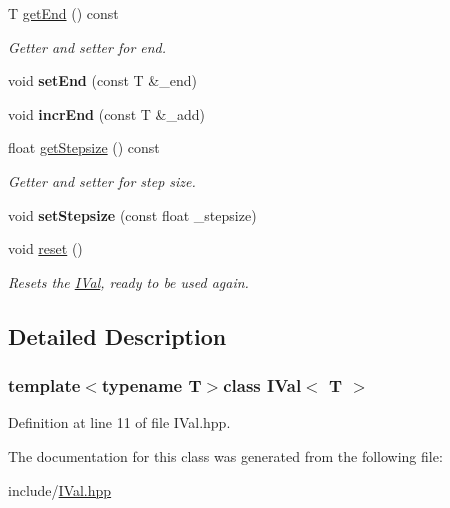 \begin{DoxyCompactItemize}
\item 
\hypertarget{class_i_val_ab24f1a760f4427dc9b2da1eec7797ff4}{}T \hyperlink{class_i_val_ab24f1a760f4427dc9b2da1eec7797ff4}{get\+End} () const \label{class_i_val_ab24f1a760f4427dc9b2da1eec7797ff4}

\begin{DoxyCompactList}\small\item\em Getter and setter for end. \end{DoxyCompactList}\item 
\hypertarget{class_i_val_adcec6c3b8739b0198004302af2ff754c}{}void {\bfseries set\+End} (const T \&\+\_\+end)\label{class_i_val_adcec6c3b8739b0198004302af2ff754c}

\item 
\hypertarget{class_i_val_a314fd482c61705706cda8370cfa1b6e6}{}void {\bfseries incr\+End} (const T \&\+\_\+add)\label{class_i_val_a314fd482c61705706cda8370cfa1b6e6}

\item 
\hypertarget{class_i_val_a53be518f044974d9da9828e84e1a8da4}{}float \hyperlink{class_i_val_a53be518f044974d9da9828e84e1a8da4}{get\+Stepsize} () const \label{class_i_val_a53be518f044974d9da9828e84e1a8da4}

\begin{DoxyCompactList}\small\item\em Getter and setter for step size. \end{DoxyCompactList}\item 
\hypertarget{class_i_val_a27792bedd5f1383ebb21e3978bc439dd}{}void {\bfseries set\+Stepsize} (const float \+\_\+stepsize)\label{class_i_val_a27792bedd5f1383ebb21e3978bc439dd}

\item 
\hypertarget{class_i_val_ac9cebbaaa41d2ba118f27a100d05c450}{}void \hyperlink{class_i_val_ac9cebbaaa41d2ba118f27a100d05c450}{reset} ()\label{class_i_val_ac9cebbaaa41d2ba118f27a100d05c450}

\begin{DoxyCompactList}\small\item\em Resets the \hyperlink{class_i_val}{I\+Val}, ready to be used again. \end{DoxyCompactList}\end{DoxyCompactItemize}


\subsection{Detailed Description}
\subsubsection*{template$<$typename T$>$class I\+Val$<$ T $>$}



Definition at line 11 of file I\+Val.\+hpp.



The documentation for this class was generated from the following file\+:\begin{DoxyCompactItemize}
\item 
include/\hyperlink{_i_val_8hpp}{I\+Val.\+hpp}\end{DoxyCompactItemize}
